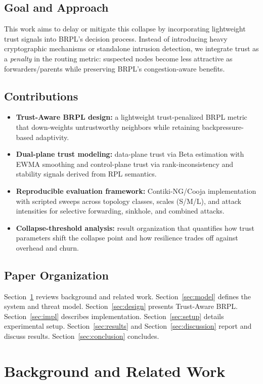 \documentclass[11pt,a4paper]{article}
\begin{document}
\subsection{Goal and Approach}
\label{subsec:goal}
This work aims to delay or mitigate this collapse by incorporating lightweight trust signals into BRPL’s decision process. Instead of introducing heavy cryptographic mechanisms or standalone intrusion detection, we integrate trust as a \emph{penalty} in the routing metric: suspected nodes become less attractive as forwarders/parents while preserving BRPL’s congestion-aware benefits.

\subsection{Contributions}
\label{subsec:contrib}
\begin{itemize}[leftmargin=*]
  \item \textbf{Trust-Aware BRPL design:} a lightweight trust-penalized BRPL metric that down-weights untrustworthy neighbors while retaining backpressure-based adaptivity.
  \item \textbf{Dual-plane trust modeling:} data-plane trust via Beta estimation with EWMA smoothing and control-plane trust via rank-inconsistency and stability signals derived from RPL semantics.
  \item \textbf{Reproducible evaluation framework:} Contiki-NG/Cooja implementation with scripted sweeps across topology classes, scales (S/M/L), and attack intensities for selective forwarding, sinkhole, and combined attacks.
  \item \textbf{Collapse-threshold analysis:} result organization that quantifies how trust parameters shift the collapse point and how resilience trades off against overhead and churn.
\end{itemize}

\subsection{Paper Organization}
Section~\ref{sec:background} reviews background and related work.
Section~\ref{sec:model} defines the system and threat model.
Section~\ref{sec:design} presents Trust-Aware BRPL.
Section~\ref{sec:impl} describes implementation.
Section~\ref{sec:setup} details experimental setup.
Section~\ref{sec:results} and Section~\ref{sec:discussion} report and discuss results.
Section~\ref{sec:conclusion} concludes.

\section{Background and Related Work}
\label{sec:background}
\end{document}
